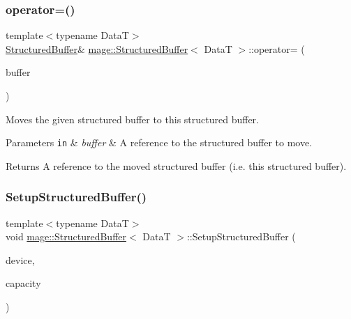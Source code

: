 \subsubsection{\texorpdfstring{operator=()}{operator=()}\hspace{0.1cm}{\footnotesize\ttfamily [2/2]}}
{\footnotesize\ttfamily template$<$typename DataT$>$ \\
\hyperlink{classmage_1_1_structured_buffer}{Structured\+Buffer}\& \hyperlink{classmage_1_1_structured_buffer}{mage\+::\+Structured\+Buffer}$<$ DataT $>$\+::operator= (\begin{DoxyParamCaption}\item[{\hyperlink{classmage_1_1_structured_buffer}{Structured\+Buffer}$<$ DataT $>$ \&\&}]{buffer }\end{DoxyParamCaption})\hspace{0.3cm}{\ttfamily [delete]}}

Moves the given structured buffer to this structured buffer.


\begin{DoxyParams}[1]{Parameters}
\mbox{\tt in}  & {\em buffer} & A reference to the structured buffer to move. \\
\hline
\end{DoxyParams}
\begin{DoxyReturn}{Returns}
A reference to the moved structured buffer (i.\+e. this structured buffer). 
\end{DoxyReturn}
\hypertarget{classmage_1_1_structured_buffer_a3a49637c7edac6bdca00cb4e8fe59887}{}\label{classmage_1_1_structured_buffer_a3a49637c7edac6bdca00cb4e8fe59887} 
\subsubsection{\texorpdfstring{Setup\+Structured\+Buffer()}{SetupStructuredBuffer()}}
{\footnotesize\ttfamily template$<$typename DataT$>$ \\
void \hyperlink{classmage_1_1_structured_buffer}{mage\+::\+Structured\+Buffer}$<$ DataT $>$\+::Setup\+Structured\+Buffer (\begin{DoxyParamCaption}\item[{I\+D3\+D11\+Device5 $\ast$}]{device,  }\item[{size\+\_\+t}]{capacity }\end{DoxyParamCaption})\hspace{0.3cm}{\ttfamily [private]}}

